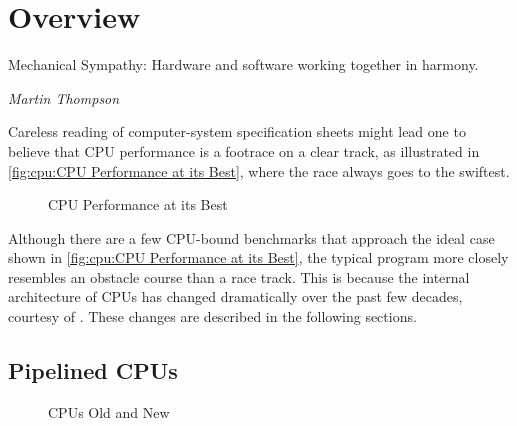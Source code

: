 
\section{Overview}
\label{sec:cpu:Overview}
%
\epigraph{Mechanical Sympathy:
	  Hardware and software working together in harmony.}
	 {\emph{Martin Thompson}}

Careless reading of computer-system specification sheets might lead one
to believe that CPU performance is a footrace on a clear track, as
illustrated in \cref{fig:cpu:CPU Performance at its Best},
where the race always goes to the swiftest.

\begin{figure}
\centering
{}
\caption{CPU Performance at its Best}
\end{figure}

Although there are a few CPU-bound benchmarks that approach the ideal case
shown in \cref{fig:cpu:CPU Performance at its Best},
the typical program more closely resembles an obstacle course than
a race track.
This is because the internal architecture of CPUs has changed dramatically
over the past few decades, courtesy of .
These changes are described in the following sections.

\subsection{Pipelined CPUs}
\label{sec:cpu:Pipelined CPUs}

\begin{figure}
\centering
{}
\caption{CPUs Old and New}
\end{figure}

